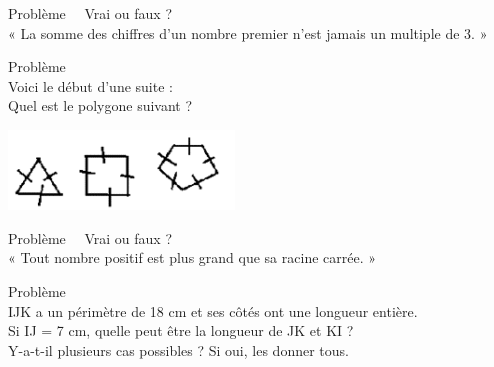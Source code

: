 \documentclass[a4paper, landscape,11pt,exos]{nsi} %
\newcounter{pbNum}
\newcommand{\pb}[1]
{
	\addtocounter{pbNum}{1}
	{\titlefont\color{UGLiBlue}\Large Problème\ \thepbNum\ \normalsize{#1}}\smallskip	
}
\begin{document}
\begin{multicols}{2}
    \newpage

    \maketitle

    \pb{ Vrai ou faux ?}\\
    « La somme des chiffres d’un nombre premier n’est jamais un multiple de 3. »\\
    \vfill\null
    \columnbreak
    

    \maketitle

    \dleft{5cm}
    {
    \pb{}\\
    Voici le début d'une suite :\\[.5em]
    Quel est le polygone suivant ?\\
    }
    {\includegraphics[width=6cm]{polynomes.png}}


    \newpage

    \maketitle

    \pb{ Vrai ou faux ?}\\
    « Tout nombre positif est plus grand que sa racine carrée. »\\
    \vfill\null
    \columnbreak
    

    \maketitle

    \pb{}\\
    IJK a un périmètre de 18 cm et ses côtés ont une longueur entière.\\
    Si IJ = 7 cm, quelle peut être la longueur de JK et KI ?\\
    Y-a-t-il plusieurs cas possibles ? Si oui, les donner tous.\\


\end{multicols}
\end{document}
